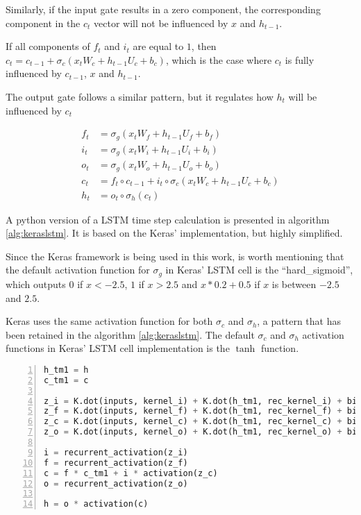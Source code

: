 Similarly, if the input gate results in a zero component, the corresponding component in the $c_t$ vector will not be influenced by $x$ and $h_{t-1}$.

If all components of $f_t$ and $i_t$ are equal to $1$, then $c_t = c_{t-1} + \sigma_c(x_t W_{c} + h_{t-1} U_{c} + b_c)$, which is the case where $c_t$ is fully influenced by $c_{t-1}$, $x$ and $h_{t-1}$.

The output gate follows a similar pattern, but it regulates how $h_t$ will be influenced by $c_t$

    \begin{align}
\label{eq:lstmequationsstart}     
f_t &= \sigma_g(x_t W_{f} + h_{t-1} U_{f} + b_f) \\
i_t &= \sigma_g(x_t W_{i} + h_{t-1} U_{i} + b_i) \\
o_t &= \sigma_g(x_t W_{o} + h_{t-1} U_{o} + b_o) \\
c_t &= f_t \circ c_{t-1} + i_t \circ \sigma_c(x_t W_{c} + h_{t-1} U_{c} + b_c) \\
\label{eq:lstmequationsend}
h_t &= o_t \circ \sigma_h(c_t)
    \end{align}


A python version of a LSTM time step calculation is presented in algorithm \ref{alg:keraslstm}. It is based on the Keras' implementation, but highly simplified.

Since the Keras framework is being used in this work, is worth mentioning that the default activation function for $\sigma_g$ in Keras' LSTM cell is the ``hard\_sigmoid'', which outputs $0$ if $x<-2.5$, $1$ if $x>2.5$ and $x*0.2 + 0.5$ if $x$ is between $-2.5$ and $2.5$.

Keras uses the same activation function for both $\sigma_c$ and $\sigma_h$, 
a pattern that has been retained in the algorithm \ref{alg:keraslstm}. The default $\sigma_c$ and $\sigma_h$ activation functions in Keras' LSTM cell implementation is the $\tanh$ function.

\noindent
\begin{algorithm}
\begin{lstlisting}[language=Python, frame=single, numbers=left, caption={Simplified version of Keras' LSTM implementation},label={alg:keraslstm}]
h_tm1 = h
c_tm1 = c

z_i = K.dot(inputs, kernel_i) + K.dot(h_tm1, rec_kernel_i) + bias_i
z_f = K.dot(inputs, kernel_f) + K.dot(h_tm1, rec_kernel_f) + bias_f
z_c = K.dot(inputs, kernel_c) + K.dot(h_tm1, rec_kernel_c) + bias_c
z_o = K.dot(inputs, kernel_o) + K.dot(h_tm1, rec_kernel_o) + bias_o

i = recurrent_activation(z_i)
f = recurrent_activation(z_f)
c = f * c_tm1 + i * activation(z_c)
o = recurrent_activation(z_o)

h = o * activation(c)
\end{lstlisting}
\end{algorithm}
